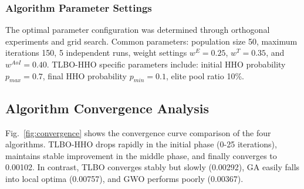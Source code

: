 \documentclass[conference]{IEEEtran}
\begin{document}
\begin{table}[!b]
  \scriptsize
  \setlength{\tabcolsep}{4pt}
  \centering
  \caption{Task Type Distribution and Characteristics}
  \label{tab:task}
\end{table}

\subsubsection{Algorithm Parameter Settings}
The optimal parameter configuration was determined through orthogonal experiments and grid search. Common parameters: population size 50, maximum iterations 150, 5 independent runs, weight settings $w^E = 0.25$, $w^T = 0.35$, and $w^{AoI} = 0.40$. TLBO-HHO specific parameters include: initial HHO probability $p_{max} = 0.7$, final HHO probability $p_{min} = 0.1$, elite pool ratio 10\%.

\subsection{Algorithm Convergence Analysis}
Fig.~\ref{fig:convergence} shows the convergence curve comparison of the four algorithms. TLBO-HHO drops rapidly in the initial phase (0-25 iterations), maintains stable improvement in the middle phase, and finally converges to 0.00102. In contrast, TLBO converges stably but slowly (0.00292), GA easily falls into local optima (0.00757), and GWO performs poorly (0.00367).
\end{document}
